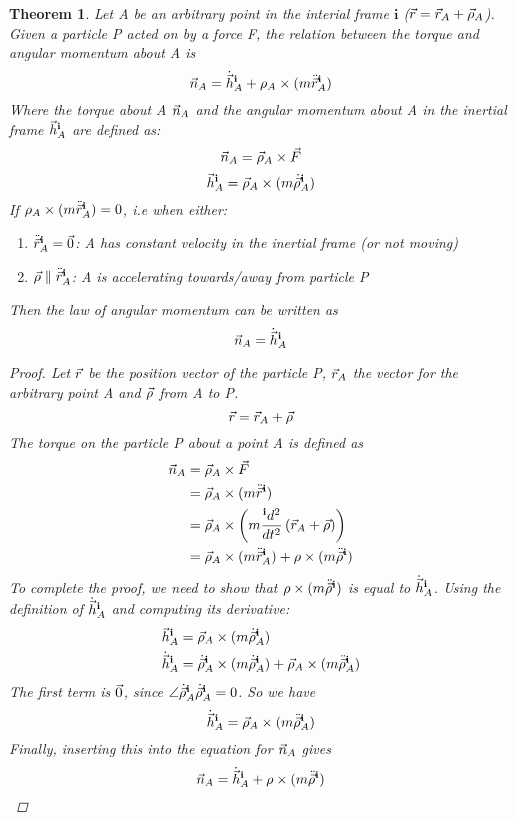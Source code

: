 \documentclass{article}
\newtheorem{theorem}{Theorem}
\begin{document}
\begin{theorem}
    Let A be an arbitrary point in the interial frame $\mathbf{i}$ ($\vec{r} = \vec{r}_A+\vec{\rho}_A$). Given a particle P acted on by a force F, the relation between the 
    torque and angular momentum about A is
    $$\vec{n}_A = \dot{\vec{h}}_A^{\mathbf{i}} + \rho_A\times(m\ddot{\vec{r}}_A^{\mathbf{i}})$$
    Where the torque about A $\vec{n}_A$ and the angular momentum about A in the inertial frame ${\vec{h}}_A^{\mathbf{i}}$ are defined as:
    $$\vec{n}_A = \vec{\rho}_A\times\vec{F}$$
    $${\vec{h}}_A^{\mathbf{i}} = \vec{\rho}_A\times(m\dot{\vec{\rho}}_A^{\mathbf{i}})$$
    If $\rho_A\times(m\ddot{\vec{r}}_A^{\mathbf{i}}) = 0$, i.e when either:
    \begin{enumerate}
        \item $\ddot{\vec{r}}_A^{\mathbf{i}} = \vec{0}$: A has constant velocity in the inertial frame (or not moving)
        \item $\vec{\rho} \parallel \ddot{\vec{r}}_A^{\mathbf{i}}$: A is accelerating towards/away from particle P
    \end{enumerate}
    Then the law of angular momentum can be written as
    $$\vec{n}_A = \dot{\vec{h}}_A^{\mathbf{i}}$$
    \begin{proof}
        Let $\vec{r}$ be the position vector of the particle P, $\vec{r}_A$ the vector for the arbitrary point A and $\vec{\rho}$ from A to P. 
        $$\vec{r} = \vec{r}_A + \vec{\rho}$$
        The torque on the particle P about a point A is defined as
        \begin{align*}
            \vec{n}_A &= \vec{\rho}_A\times\vec{F} \\
            &=\vec{\rho}_A\times (m\ddot{\vec{r}}^{\mathbf{i}}) \\
            &=\vec{\rho}_A\times \left(m\frac{{}^{\mathbf{i}}d^2}{dt^2}\left(\vec{r}_A + \vec{\rho}\right)\right) \\
            &= \vec{\rho}_A \times (m\ddot{\vec{r}}_A^{\mathbf{i}}) + \rho \times (m\ddot{\vec{\rho}}^{\mathbf{i}})
        \end{align*}
        To complete the proof, we need to show that $\rho \times (m\ddot{\vec{\rho}}^{\mathbf{i}})$ is equal to $\dot{\vec{h}}_A^{\mathbf{i}}$.
        Using the definition of $\dot{\vec{h}}_A^{\mathbf{i}}$ and computing its derivative:
        \begin{align*}
            {\vec{h}}_A^{\mathbf{i}} &= \vec{\rho}_A\times(m\dot{\vec{\rho}}_A^{\mathbf{i}})\\
            \dot{\vec{h}}_A^{\mathbf{i}} &= \dot{\vec{\rho}}_A^{\mathbf{i}}\times(m\dot{\vec{\rho}}_A^{\mathbf{i}}) + \vec{\rho}_A\times(m\ddot{\vec{\rho}}_A^{\mathbf{i}})
        \end{align*}
        The first term is $\vec{0}$, since $\angle\dot{\vec{\rho}}_A^{\mathbf{i}}\dot{\vec{\rho}}_A^{\mathbf{i}} = 0$. So we have
        $$\dot{\vec{h}}_A^{\mathbf{i}} = \vec{\rho}_A\times(m\ddot{\vec{\rho}}_A^{\mathbf{i}})$$
        Finally, inserting this into the equation for $\vec{n}_A$ gives
        $$\vec{n}_A = \dot{\vec{h}}_A^{\mathbf{i}} +  \rho \times (m\ddot{\vec{\rho}}^{\mathbf{i}})$$
    \end{proof}
\end{theorem}
\end{document}
